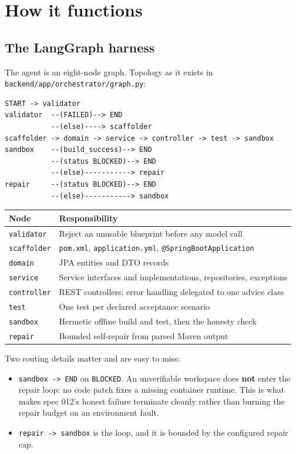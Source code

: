 \documentclass[11pt,a4paper]{article}
\begin{document}
\section{How it functions}

\subsection{The LangGraph harness}

The agent is an eight-node graph. Topology as it exists in
\texttt{backend/app/orchestrator/graph.py}:

\begin{lstlisting}
START -> validator
validator  --(FAILED)--> END
           --(else)----> scaffolder
scaffolder -> domain -> service -> controller -> test -> sandbox
sandbox    --(build_success)--> END
           --(status BLOCKED)--> END
           --(else)-----------> repair
repair     --(status BLOCKED)--> END
           --(else)-----------> sandbox
\end{lstlisting}

\begin{center}
\begin{tabular}{@{}ll@{}}
\toprule
\textbf{Node} & \textbf{Responsibility} \\
\midrule
\texttt{validator} & Reject an unusable blueprint before any model call \\
\texttt{scaffolder} & \texttt{pom.xml}, \texttt{application.yml}, \texttt{@SpringBootApplication} \\
\texttt{domain} & JPA entities and DTO records \\
\texttt{service} & Service interfaces and implementations, repositories, exceptions \\
\texttt{controller} & REST controllers; error handling delegated to one advice class \\
\texttt{test} & One test per declared acceptance scenario \\
\texttt{sandbox} & Hermetic offline build and test, then the honesty check \\
\texttt{repair} & Bounded self-repair from parsed Maven output \\
\bottomrule
\end{tabular}
\end{center}

Two routing details matter and are easy to miss:

\begin{itemize}[leftmargin=1.4em]
  \item \texttt{sandbox -> END} on \texttt{BLOCKED}. An unverifiable workspace does
  \textbf{not} enter the repair loop: no code patch fixes a missing container
  runtime. This is what makes spec 012's honest failure terminate cleanly rather
  than burning the repair budget on an environment fault.
  \item \texttt{repair -> sandbox} is the loop, and it is bounded by the configured
  repair cap.
\end{itemize}
\end{document}
